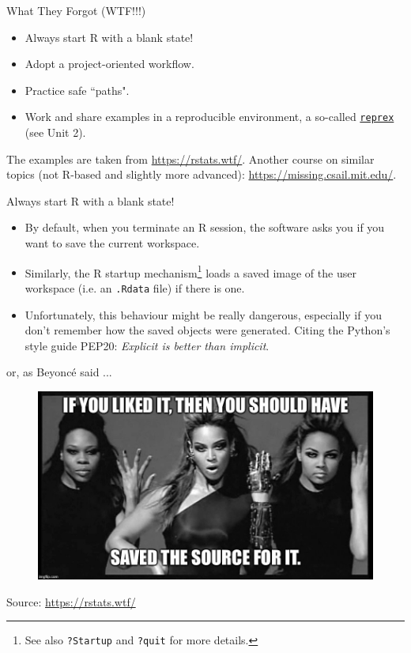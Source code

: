 \documentclass[
hyperref={bookmarks=false},
xcolor={dvipsnames,svgnames*,x11names*}, 
12pt
]{beamer}
\begin{document}
\begin{frame}{What They Forgot (WTF!!!)}
\vspace{-0.75cm}
\begin{itemize}
\itemsep 2ex
\item Always start R with a blank state!
\item Adopt a project-oriented workflow. 
\item Practice safe ``paths". 
\item Work and share examples in a reproducible environment, a so-called \href{https://reprex.tidyverse.org/}{\texttt{reprex}} (see Unit 2). 	
\end{itemize}

\vspace{0.5cm}

The examples are taken from \url{https://rstats.wtf/}. Another course on similar topics (not R-based and slightly more advanced): \url{https://missing.csail.mit.edu/}. 
\end{frame}

\begin{frame}{Always start R with a blank state!}
\vspace{-0.5cm}
\begin{itemize}
\itemsep 3ex
\item By default, when you terminate an R session, the software asks you if you want to save the current workspace. 
\item Similarly, the R startup mechanism\footnote{See also \texttt{?Startup} and \texttt{?quit} for more details.} loads a saved image of the user workspace (i.e. an \texttt{.Rdata} file) if there is one. 
\item Unfortunately, this behaviour might be really dangerous, especially if you don't remember how the saved objects were generated. Citing the Python's style guide PEP20: \textit{Explicit is better than implicit}.  
\end{itemize}
\end{frame}

\begin{frame}{or, as Beyoncé said ...}
\vspace{-0.5cm}
\begin{figure}
\centering
\includegraphics[width=\linewidth]{figures/rihanna.jpg}
\end{figure}
Source: \url{https://rstats.wtf/}
\end{frame}
\end{document}
